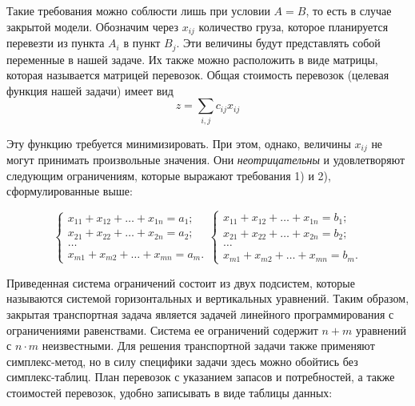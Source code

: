 Такие требования можно соблюсти лишь при условии $A = B$, то есть  в случае закрытой модели. Обозначим через $x_{ij}$ количество груза, которое планируется перевезти из пункта $A_i$ в пункт $B_j$. Эти величины  будут представлять собой переменные в нашей задаче. Их также можно расположить в виде матрицы, которая называется матрицей перевозок. Общая стоимость перевозок (целевая функция нашей задачи) имеет вид
\[z = \sum_{i,j}c_{ij}x_{ij}\]

Эту функцию требуется минимизировать. При этом, однако, величины $x_{ij}$ не  могут  принимать  произвольные  значения. Они {\it неотрицательны} и удовлетворяют следующим ограничениям, которые  выражают  требования 1) и 2), сформулированные выше:

$$\begin{cases}
x_{11} + x_{12} + \ldots + x_{1n} = a_1;\\
x_{21} + x_{22} + \ldots + x_{2n} = a_2;\\
\ldots \\
x_{m1} + x_{m2} + \ldots + x_{mn} = a_m.
\end{cases}
\begin{cases}
x_{11} + x_{12} + \ldots + x_{1n} = b_1;\\
x_{21} + x_{22} + \ldots + x_{2n} = b_2;\\
\ldots \\
x_{m1} + x_{m2} + \ldots + x_{mn} = b_m.
\end{cases}$$

Приведенная система ограничений состоит из двух подсистем, которые называются системой горизонтальных и вертикальных уравнений. Таким образом, закрытая транспортная задача является задачей линейного программирования с ограничениями равенствами. Система  ее  ограничений содержит $n + m$ уравнений с $n\cdot m$ неизвестными. Для решения транспортной задачи также применяют симплекс-метод, но в силу специфики задачи здесь можно обойтись без симплекс-таблиц. План перевозок с указанием запасов и потребностей, а также стоимостей перевозок, удобно записывать в виде таблицы данных:

\begin{figure}[h]
\end{figure}

